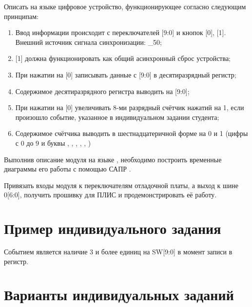 \par{Описать на языке  цифровое устройство, функционирующее согласно следующим принципам:
\begin{enumerate}[noitemsep,topsep=0pt, after=\vspace{2pt}]
  \item Ввод информации происходит с переключателей [9:0] и кнопок [0], [1]. Внешний источник сигнала синхронизации: \_50;
  \item {}[1] должна функционировать как общий асинхронный сброс устройства;
  \item При нажатии на [0] записывать данные с [9:0] в десятиразрядный регистр;
  \item Содержимое десятиразрядного регистра выводить на [9:0];
  \item При нажатии на [0] увеличивать 8-ми разрядный счётчик нажатий на 1, если произошло событие, указанное в индивидуальном задании студента;
  \item Содержимое счётчика выводить в шестнадцатеричной форме на 0 и 1 (цифры с 0 до 9 и буквы , , , , , )
\end{enumerate}}

\par{Выполнив описание модуля на языке , необходимо построить временные диаграммы его работы с помощью САПР .}

\par{Привязать входы модуля к переключателям  отладочной платы, а выход к шине 0[6:0], получить прошивку для ПЛИС и продемонстрировать её работу.}

\section{Пример индивидуального задания}

\par{Событием является наличие 3 и более единиц на SW[9:0] в момент записи в регистр.}










\section{Варианты индивидуальных заданий}


